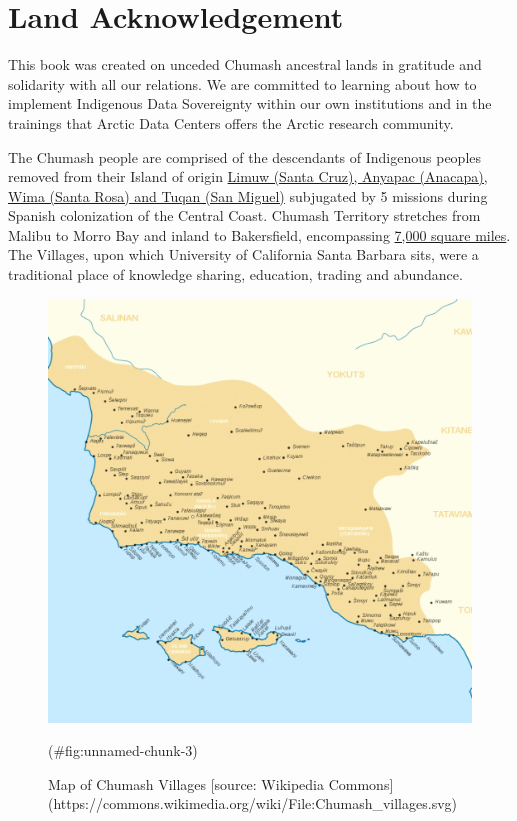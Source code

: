 \documentclass[
]{book}
\begin{document}
\hypertarget{land-acknowledgement}{%
\section*{Land Acknowledgement}\label{land-acknowledgement}}

This book was created on unceded Chumash ancestral lands in gratitude and solidarity with all our relations. We are committed to learning about how to implement Indigenous Data Sovereignty within our own institutions and in the trainings that Arctic Data Centers offers the Arctic research community.

The Chumash people are comprised of the descendants of Indigenous peoples removed from their Island of origin \href{https://external.as.ucsb.edu/land-acknowledgment/}{Limuw (Santa Cruz), Anyapac (Anacapa), Wima (Santa Rosa) and Tuqan (San Miguel)} subjugated by 5 missions during Spanish colonization of the Central Coast. Chumash Territory stretches from Malibu to Morro Bay and inland to Bakersfield, encompassing \href{https://www.santaynezchumash.org/chumash-history}{7,000 square miles}. The Villages, upon which University of California Santa Barbara sits, were a traditional place of knowledge sharing, education, trading and abundance.

\begin{figure}
\includegraphics[width=14.22in]{images/chumash_territory} \caption{Map of Chumash Villages [source: Wikipedia Commons](https://commons.wikimedia.org/wiki/File:Chumash_villages.svg)}(\#fig:unnamed-chunk-3)
\end{figure}
\end{document}
